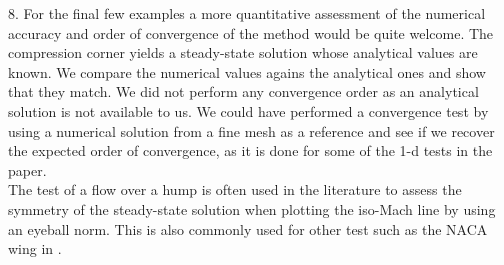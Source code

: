 \documentclass{article}
\begin{document}
{
\color{blue}
8. For the final few examples a more quantitative assessment of the
numerical accuracy and order of convergence of the method would be
quite welcome.
}
The compression corner yields a steady-state solution whose analytical values are known. We compare the numerical values agains the analytical ones and show that they match. We did not perform any convergence order as an analytical solution is not available to us. We could have performed a convergence test by using a numerical solution from a fine mesh as a reference and see if we recover the expected order of convergence, as it is done for some of the 1-d tests in the paper. \\

The test of a flow over a hump is often used in the literature to assess the symmetry of the steady-state solution when plotting the iso-Mach line by using an eyeball norm. This is also commonly used for other test such as the NACA wing in \cite{LowMach1}.
\bigskip


\end{document}

